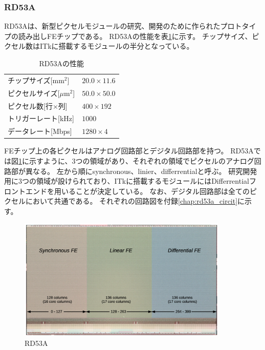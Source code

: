 \subsubsection{RD53A}
RD53A\cite{2-1}は、新型ピクセルモジュールの研究、開発のために作られたプロトタイプの読み出しFEチップである。
RD53Aの性能を表\ref{rd53a_spec}に示す。
チップサイズ、ピクセル数はITkに搭載するモジュールの半分となっている。

\begin{table}[tbp]
\begin{center}
\caption[RD53Aの性能]{RD53Aの性能}
\label{rd53a_spec}
  \begin{tabular}{|ll|} \hline
    チップサイズ[mm$^2$] & $20.0\times 11.6$ \\ 
    ピクセルサイズ[$\mu$m$^2$] & $50.0\times 50.0$ \\ 
    ピクセル数[行$\times$列] & $400\times 192$ \\ 
    トリガーレート[kHz] & $1000$ \\ 
    データレート[Mbps] & $1280\times4$ \\ \hline
  \end{tabular}
\end{center}
\end{table}

FEチップ上の各ピクセルはアナログ回路部とデジタル回路部を持つ。
RD53Aでは図\ref{fechip_rd53a}に示すように、3つの領域があり、それぞれの領域でピクセルのアナログ回路部が異なる。
左から順にsynchronous、linier、differrentialと呼ぶ。
研究開発用に3つの領域が設けられており、ITkに搭載するモジュールにはDifferrentialフロントエンドを用いることが決定している。
なお、デジタル回路部は全てのピクセルにおいて共通である。
それぞれの回路図を付録\ref{chap:rd53a_circit}に示す。

\begin{figure}[bpt]\centering
\includegraphics[width=10cm]{fechip_rd53a}
\caption[RD53A]{RD53A\cite{2-1}}
\label{fechip_rd53a}
\end{figure}

